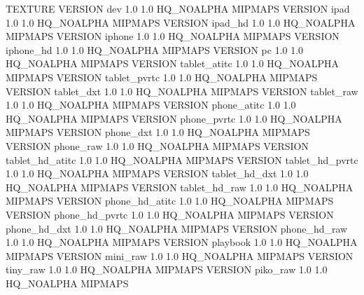 TEXTURE
{
	VERSION dev			1.0 1.0		HQ_NOALPHA MIPMAPS
	VERSION ipad		1.0 1.0 	HQ_NOALPHA MIPMAPS
	VERSION ipad_hd		1.0 1.0 	HQ_NOALPHA MIPMAPS
	VERSION iphone 		1.0 1.0 	HQ_NOALPHA MIPMAPS
	VERSION iphone_hd	1.0 1.0		HQ_NOALPHA MIPMAPS
	VERSION pc 			1.0 1.0 	HQ_NOALPHA MIPMAPS
	VERSION tablet_atitc	1.0	1.0	HQ_NOALPHA MIPMAPS
	VERSION tablet_pvrtc	1.0	1.0	HQ_NOALPHA MIPMAPS
	VERSION tablet_dxt		1.0	1.0	HQ_NOALPHA MIPMAPS
	VERSION tablet_raw		1.0	1.0	HQ_NOALPHA MIPMAPS
	VERSION phone_atitc		1.0	1.0	HQ_NOALPHA MIPMAPS
	VERSION phone_pvrtc		1.0	1.0	HQ_NOALPHA MIPMAPS
	VERSION phone_dxt		1.0	1.0	HQ_NOALPHA MIPMAPS
	VERSION phone_raw		1.0	1.0	HQ_NOALPHA MIPMAPS
	VERSION tablet_hd_atitc	1.0	1.0	HQ_NOALPHA MIPMAPS
	VERSION tablet_hd_pvrtc	1.0	1.0	HQ_NOALPHA MIPMAPS
	VERSION tablet_hd_dxt	1.0	1.0	HQ_NOALPHA MIPMAPS
	VERSION tablet_hd_raw	1.0	1.0	HQ_NOALPHA MIPMAPS
	VERSION phone_hd_atitc	1.0	1.0	HQ_NOALPHA MIPMAPS
	VERSION phone_hd_pvrtc	1.0	1.0	HQ_NOALPHA MIPMAPS
	VERSION phone_hd_dxt	1.0	1.0	HQ_NOALPHA MIPMAPS
	VERSION phone_hd_raw	1.0	1.0	HQ_NOALPHA MIPMAPS
	VERSION playbook	1.0 1.0 	HQ_NOALPHA MIPMAPS
	VERSION mini_raw		1.0 1.0	HQ_NOALPHA MIPMAPS
	VERSION tiny_raw		1.0 1.0	HQ_NOALPHA MIPMAPS
	VERSION piko_raw		1.0 1.0	HQ_NOALPHA MIPMAPS
}

